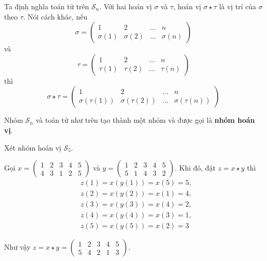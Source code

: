 Ta định nghĩa toán tử trên $\mathcal{S}_n$. Với hai hoán vị $\sigma$ và $\tau$, hoán vị $\sigma \star \tau$ là vị trí của $\sigma$ theo $\tau$. Nói cách khác, nếu 
\begin{equation*}
    \sigma = \begin{pmatrix}
    1 & 2 & \ldots & n \\
    \sigma(1) & \sigma(2) & \ldots & \sigma(n)
\end{pmatrix}
\end{equation*}
và 
\begin{equation*}
    \tau = \begin{pmatrix}
    1 & 2 & \ldots & n \\
    \tau(1) & \tau(2) & \ldots & \tau(n)
\end{pmatrix}
\end{equation*}
thì 
\begin{equation*}
    \sigma \star \tau =
\begin{pmatrix}
    1 & 2 & \ldots & n \\
    \sigma(\tau(1)) & \sigma(\tau(2)) & \ldots & \sigma(\tau(n))   
\end{pmatrix}
\end{equation*}

Nhóm $\mathcal{S}_n$ và toán tử như trên tạo thành một nhóm và được gọi là
\textbf{nhóm hoán vị}.

\begin{example}
    Xét nhóm hoán vị $\mathcal{S}_5$. 
    
    Gọi $x = \begin{pmatrix}
        1 & 2 & 3 & 4 & 5 \\ 4 & 3 & 1 & 2 & 5
    \end{pmatrix}$ và
    $y = \begin{pmatrix}
        1 & 2 & 3 & 4 & 5 \\ 5 & 1 & 4 & 3 & 2
    \end{pmatrix}$. Khi đó, đặt $z = x \star y$ thì
    \begin{align*}
        & z(1) = x(y(1)) = x(5) = 5, \\
        & z(2) = x(y(2)) = x(1) = 4, \\
        & z(3) = x(y(3)) = x(4) = 2, \\
        & z(4) = x(y(4)) = x(3) = 1, \\ 
        & z(5) = x(y(5)) = x(2) = 3
    \end{align*}

    Như vậy $z = x \star y = \begin{pmatrix}
        1 & 2 & 3 & 4 & 5 \\ 5 & 4 & 2 & 1 & 3
    \end{pmatrix}$.
\end{example}

